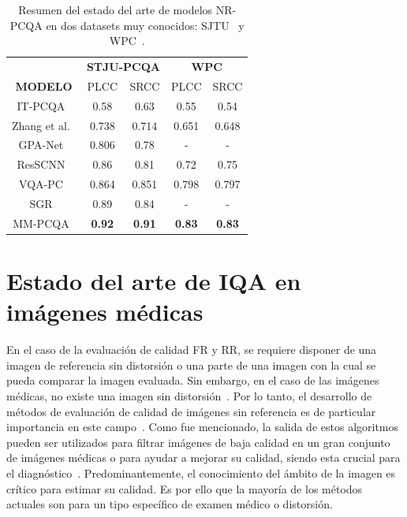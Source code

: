 \begin{table}[htp]
  \tiny
  \centering
  \begin{tabular}{|c|c|c|c|c|}
      \hline
      \rowcolor[HTML]{FFC702}
      \cellcolor[HTML]{FFC702} & \multicolumn{2}{c|}{\cellcolor[HTML]{FFC702}\textbf{STJU-PCQA}} & \multicolumn{2}{c|}{\cellcolor[HTML]{FFC702}\textbf{WPC}} \\ 
      \cline{2-5}
     \multirow{-2}{*}{\cellcolor[HTML]{FFC702}\textbf{MODELO}}  &\multicolumn{1}{c|}{\cellcolor[HTML]{FFC702} PLCC} & \multicolumn{1}{c|}{\cellcolor[HTML]{FFC702}SRCC} & \multicolumn{1}{c|}{\cellcolor[HTML]{FFC702}PLCC} & \multicolumn{1}{c|}{\cellcolor[HTML]{FFC702}SRCC} \\
      \hline
      IT-PCQA~\cite{IT-PCQA}& 0.58 & 0.63 & 0.55  & 0.54\\
      \hline
      Zhang et al.~\cite{NR3DQA}& 0.738 & 0.714 & 0.651 & 0.648\\
      \hline
      GPA-Net~\cite{GPA-NET} & 0.806 & 0.78 & - & - \\
      \hline
      ResSCNN~\cite{ResSCNN} & 0.86 & 0.81 & 0.72 & 0.75\\
      \hline
      VQA-PC~\cite{VQA-PC} & 0.864 & 0.851 & 0.798 & 0.797\\
      \hline
      SGR~\cite{SGR} & 0.89 & 0.84 & - & - \\
      \hline
     MM-PCQA~\cite{MM-PCQA} & \textbf{0.92} & \textbf{0.91} & \textbf{0.83} & \textbf{0.83}\\
      \hline
  \end{tabular}
    \caption[Estado del arte de modelos NR-PCQA.]{Resumen del estado del arte de modelos NR-PCQA en dos datasets muy conocidos: SJTU~\cite{SJTU} y WPC~\cite{WPC1,WPC2}.}
\end{table}

\section{Estado del arte de IQA en imágenes médicas}
En el caso de la evaluación de calidad FR y RR, se requiere disponer 
de una imagen de referencia sin distorsión o una parte de una imagen con la cual 
se pueda comparar la imagen evaluada. Sin embargo, en el caso de las imágenes médicas, 
no existe una imagen sin distorsión~\cite{DicomDistortionsExample}. 
Por lo tanto, el desarrollo de métodos de evaluación de calidad de imágenes 
sin referencia es de particular importancia en este campo~\cite{LGP, BRISQUE, IQA-CNN, DIQaM, Hallucinated-IQA}.
Como fue mencionado, la salida de estos algoritmos pueden ser utilizados 
para filtrar imágenes de baja calidad en un gran conjunto de imágenes médicas o 
para ayudar a mejorar su calidad, siendo esta crucial para el diagnóstico~\cite{DicomDistortionsExample}.
Predominantemente, el conocimiento del ámbito de la imagen es crítico para estimar 
su calidad. Es por ello que la mayoría de los métodos actuales son para un tipo específico 
de examen médico o distorsión.

